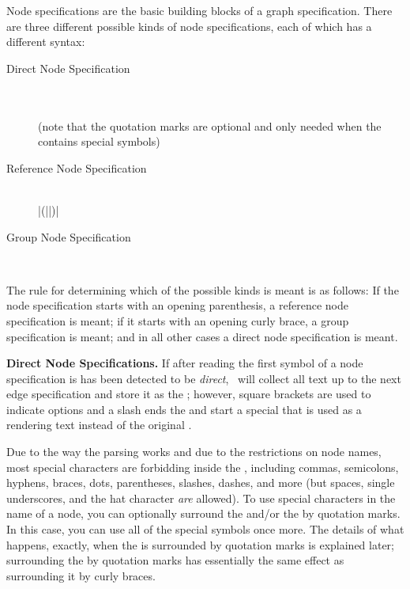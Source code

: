 Node specifications are the basic building blocks of a graph specification.
There are three different possible kinds of node specifications, each of which
has a different syntax:
%
\begin{description}
    \item[Direct Node Specification]
        \ \\
         \\
        (note that the quotation marks are optional and only needed when the
         contains special symbols)
    \item[Reference Node Specification]
        \ \\
        |(||)|
    \item[Group Node Specification]
        \ \\
\end{description}

The rule for determining which of the possible kinds is meant is as follows: If
the node specification starts with an opening parenthesis, a reference node
specification is meant; if it starts with an opening curly brace, a group
specification is meant; and in all other cases a direct node specification is
meant.

\medskip
\textbf{Direct Node Specifications.} If after reading the first symbol of a
node specification is has been detected to be \emph{direct}, \tikzname\ will
collect all text up to the next edge specification and store it as the
; however, square brackets are used to indicate options and a
slash ends the  and start a special  that is used as
a rendering text instead of the original .

Due to the way the parsing works and due to the restrictions on node names,
most special characters are forbidding inside the , including
commas, semicolons, hyphens, braces, dots, parentheses, slashes, dashes, and
more (but spaces, single underscores, and the hat character \emph{are}
allowed). To use special characters in the name of a node, you can optionally
surround the  and/or the  by quotation marks. In
this case, you can use all of the special symbols once more. The details of
what happens, exactly, when the  is surrounded by quotation
marks is explained later; surrounding the  by quotation marks has
essentially the same effect as surrounding it by curly braces.

